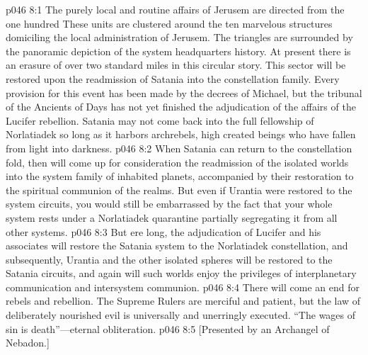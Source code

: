 \vs p046 8:1 The purely local and routine affairs of Jerusem are directed from the one hundred  These units are clustered around the ten marvelous structures domiciling the local administration of Jerusem. The triangles are surrounded by the panoramic depiction of the system headquarters history. At present there is an erasure of over two standard miles in this circular story. This sector will be restored upon the readmission of Satania into the constellation family. Every provision for this event has been made by the decrees of Michael, but the tribunal of the Ancients of Days has not yet finished the adjudication of the affairs of the Lucifer rebellion. Satania may not come back into the full fellowship of Norlatiadek so long as it harbors archrebels, high created beings who have fallen from light into darkness.
\vs p046 8:2 When Satania can return to the constellation fold, then will come up for consideration the readmission of the isolated worlds into the system family of inhabited planets, accompanied by their restoration to the spiritual communion of the realms. But even if Urantia were restored to the system circuits, you would still be embarrassed by the fact that your whole system rests under a Norlatiadek quarantine partially segregating it from all other systems.
\pc \vs p046 8:3 But ere long, the adjudication of Lucifer and his associates will restore the Satania system to the Norlatiadek constellation, and subsequently, Urantia and the other isolated spheres will be restored to the Satania circuits, and again will such worlds enjoy the privileges of interplanetary communication and intersystem communion.
\pc \vs p046 8:4 There will come an end for rebels and rebellion. The Supreme Rulers are merciful and patient, but the law of deliberately nourished evil is universally and unerringly executed. “The wages of sin is death”---eternal obliteration.
\vsetoff
\vs p046 8:5 [Presented by an Archangel of Nebadon.]

